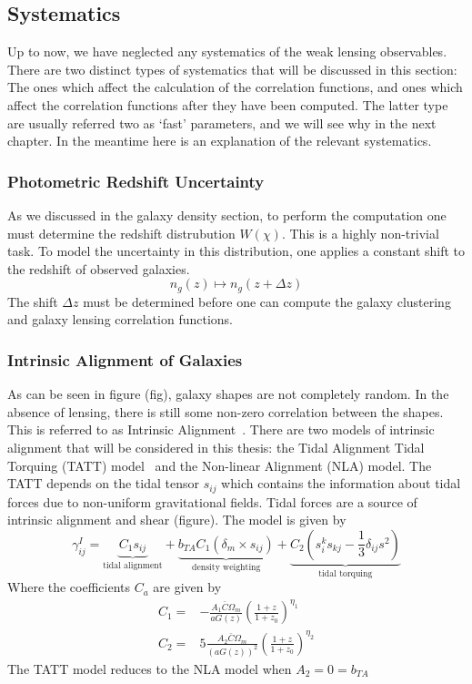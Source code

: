 \subsection{Systematics}
Up to now, we have neglected any systematics of the weak lensing observables. There are two distinct types of systematics that will be discussed in this section: The ones which affect the calculation of the correlation functions, and ones which affect the correlation functions after they have been computed. The latter type are usually referred two as `fast' parameters, and we will see why in the next chapter. In the meantime here is an explanation of the relevant systematics.
\subsubsection{Photometric Redshift Uncertainty}
As we discussed in the galaxy density section, to perform the computation one must determine the redshift distrubution $W(\chi)$. This is a highly non-trivial task. To model the uncertainty in this distribution, one applies a constant shift to the redshift of observed galaxies.
\begin{equation}
	n_g(z) \mapsto n_g(z+\Delta z)
\end{equation}
The shift $\Delta z$ must be determined before one can compute the galaxy clustering and galaxy lensing correlation functions.
\subsubsection{Intrinsic Alignment of Galaxies}
As can be seen in figure (fig), galaxy shapes are not completely random. In the absence of lensing, there is still some non-zero correlation between the shapes. This is referred to as Intrinsic Alignment~\cite{troxel_intrinsic_2015,scott_dodelson_modern_2021}. There are two models of intrinsic alignment that will be considered in this thesis: the Tidal Alignment Tidal Torquing (TATT) model~\cite{krause_dark_2021,blazek_beyond_2019} and the Non-linear Alignment (NLA) model. The TATT depends on the tidal tensor $s_{ij}$ which contains the information about tidal forces due to non-uniform gravitational fields. Tidal forces are a source of intrinsic alignment and shear (figure). The model is given by
\begin{equation}
	\gamma_{ij}^I = \underbrace{C_1s_{ij}}_{\text{tidal alignment}}+
	\underbrace{b_{TA}C_1(\delta_m\times s_{ij})}_{\text{density weighting}}+
	\underbrace{C_2\left( s_i^ks_{kj}-\frac{1}{3}\delta_{ij}s^2 \right)}_{\text{tidal torquing}}
\end{equation}
Where the coefficients $C_a$ are given by
\begin{equation}
	\begin{split}
		C_1 =& -\frac{A_1\bar{C}\Omega_m}{aG(z)}\left(\frac{1+z}{1+z_0}\right)^{\eta_1} \\
		C_2 =& 5\frac{A_2\bar{C}\Omega_m}{(aG(z))^2}\left(\frac{1+z}{1+z_0}\right)^{\eta_2}
	\end{split}
\end{equation}
The TATT model reduces to the NLA model when $A_2=0=b_{TA}$

